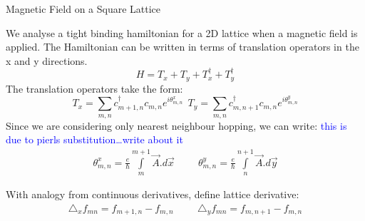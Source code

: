 \documentclass[12pt, oneside, listof=totoc,dvipsnames]{scrbook}
\begin{document}
	
	
	
	
	
	
	
	
	
	
	
	
	
	
	
	
	
	
	
	
	\begin{chapter}{Magnetic Field on a Square Lattice}
		
		We analyse a tight binding hamiltonian for a 2D lattice when a magnetic field is applied. The Hamiltonian can be written in terms of translation operators in the x and y directions. 
		\[H= T_x+T_y+T^\dagger_x+T^\dagger_y\]
		\noindent
		The translation operators take the form:
		\[T_x = \sum \limits_{m,n} c^\dagger_{m+1,n}c_{m,n}e^{i\theta^x_{m,n}} \ \ T_y = \sum \limits_{m,n} c^\dagger_{m,n+1}c_{m,n}e^{i\theta^y_{m,n}}\]
		\noindent
		Since we are considering only nearest neighbour hopping, we can write: \textcolor{blue}{this is due to pierls substitution\ldots write about it}
		\begin{align*}
			\theta^x_{m,n} = \frac{e}{\hbar}\int \limits_m^{m+1} \Vec{A}. d\Vec{x}\hspace{1cm}
			\theta^y_{m,n} = \frac{e}{\hbar}\int \limits_n^{n+1} \Vec{A}. d\Vec{y}
		\end{align*}
		
		With analogy from continuous derivatives, define lattice derivative: 
		\begin{align*}
			\triangle_x f_{mn} = f_{m+1,n}-f_{m,n}\hspace{1cm}
			\triangle_y f_{mn} = f_{m,n+1}-f_{m,n}
		\end{align*}
		
		
		
		
		\begin{center}
			
			
			
			
			
			\begin{tikzpicture}[x=0.75pt,y=0.75pt,yscale=-1,xscale=1]
				

\end{tikzpicture}
\end{center}
\end{chapter}
\end{document}

